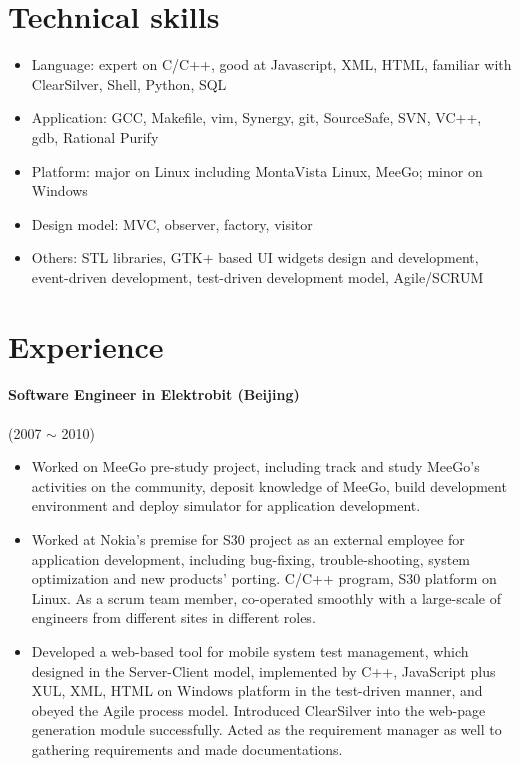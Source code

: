 \documentclass[a4paper,11pt]{article}
\begin{document}
\section*{Technical skills}
\begin{itemize}
\item Language: expert on C/C++, good at Javascript, XML, HTML, familiar with ClearSilver, Shell, Python, SQL
\item Application: GCC, Makefile, vim, Synergy, git, SourceSafe, SVN, VC++, gdb, Rational Purify
\item Platform: major on Linux including MontaVista Linux, MeeGo; minor on Windows
\item Design model: MVC, observer, factory, visitor
\item Others: STL libraries, GTK+ based UI widgets design and development, event-driven development, test-driven development model, Agile/SCRUM
\end{itemize}

\section*{Experience}

\paragraph{Software Engineer in Elektrobit (Beijing)} (2007 $\sim$ 2010)
\begin{itemize}
\item Worked on MeeGo pre-study project, including track and study MeeGo's activities on the community, deposit knowledge of MeeGo, build development environment and deploy simulator for application development.
\item Worked at Nokia's premise for S30 project as an external employee for application development, including bug-fixing, trouble-shooting, system optimization and new products' porting. C/C++ program, S30 platform on Linux. As a scrum team member, co-operated smoothly with a large-scale of engineers from different sites in different roles.
\item Developed a web-based tool for mobile system test management, which designed in the Server-Client model, implemented by C++, JavaScript plus XUL, XML, HTML on Windows platform in the test-driven manner, and obeyed the Agile process model. Introduced ClearSilver into the web-page generation module successfully. Acted as the requirement manager as well to gathering requirements and made documentations.
\end{itemize}
\end{document}
